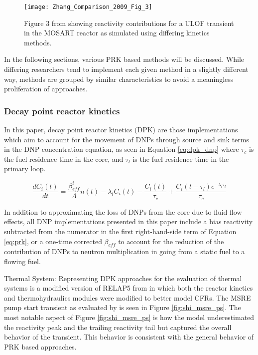 \documentclass[review]{elsarticle}
\begin{document}
\begin{figure}[H]
   \centering
   \texttt{[image: Zhang\_Comparison\_2009\_Fig\_3]}
   \caption{Figure 3 from \cite{zhang_comparison_2009} showing reactivity contributions for a
   ULOF transient in the MOSART reactor as simulated using differing kinetics methods.} 
   \label{fig:zhang_prk_reac}
\end{figure}

In the following
sections, various PRK based methods will be discussed. 
While differing researchers
tend to implement each given method in a slightly different way, methods are
grouped by similar characteristics to avoid a meaningless proliferation of
approaches.

\subsubsection{Decay point reactor kinetics} \label{sssec:dpk}
In this paper,
decay point reactor kinetics (DPK) are those implementations
which aim to account for the movement of DNPs through source and sink terms
in the DNP concentration equation, as seen in Equation \ref{eq:dpk_dnp}
where $\tau_{c}$ is the fuel residence time in the core, and $\tau_{l}$ is the
fuel residence time in the primary loop.

\begin{equation}
    \label{eq:dpk_dnp}
    \frac{dC_{i}(t)}{dt} = \frac{\beta_{eff}^{i}}{\Lambda} n(t) -
        \lambda_{i} C_{i}(t) - \frac{C_{i}(t)}{\tau_{c}} +
        \frac{C_{i}(t - \tau_{l}) e^{-\lambda_{i} \tau_{l}}}{\tau_{c}}
\end{equation}

In addition to approximating the loss of DNPs from the core due to fluid
flow effects, all DNP implementations presented in this paper include
a bias reactivity subtracted from the numerator in the first right-hand-side
term of Equation \ref{eq:prk}, or a one-time corrected $\beta_{eff}$ to account
for the reduction of the contribution of DNPs to neutron multiplication in
going from a static fuel to a flowing fuel.

\par Thermal System: Representing DPK approaches for the evaluation of thermal
systems is a modified version of RELAP5 from \cite{shi_development_2016} in
which both the reactor kinetics and thermohydraulics modules were modified
to better model CFRs. The MSRE pump start transient as evaluated by
\cite{shi_development_2016} is seen in Figure \ref{fig:shi_msre_ps}. The most
notable aspect of Figure \ref{fig:shi_msre_ps} is how the model underestimated
the reactivity peak and the trailing reactivity tail but captured the
overall behavior of the transient. This behavior is consistent with the
general behavior of PRK based approaches.
\end{document}
